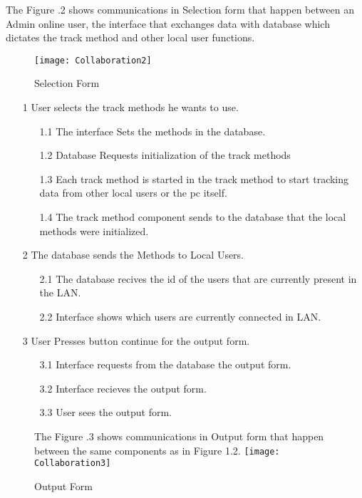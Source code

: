 The Figure \thesection.2 shows communications in Selection form that happen between an Admin online user, the interface that exchanges data with database which dictates the track method and other local user functions.
\begin{figure}[h!]
	\centering
\texttt{[image: Collaboration2]}
	\caption{Selection Form} 
\end{figure}
\begin{flushleft}
\begin{enumerate}
   \item[1] User selects the track methods he wants to use.
   \begin{itemize}
     \item[1.1] The interface Sets the methods in the database.
     \item[1.2] Database Requests initialization of the track methods
     \item[1.3] Each track method is started in the track method to start tracking data from other local users or the pc itself.
     \item[1.4] The track method component sends to the database that the local methods were initialized.
   \end{itemize}
   \item[2] The database sends the Methods to Local Users.
   \begin{itemize}
     \item[2.1] The database recives the id of the users that are currently present in the LAN. 
     \item[2.2] Interface shows which users are currently connected in LAN.
   \end{itemize}
   \item[3] User Presses button continue for the output form.
   \begin{itemize}
     \item[3.1] Interface requests from the database the output form.
     \item[3.2] Interface recieves the output form.
     \item[3.3]  User sees the output form.
   \end{itemize}
\end{enumerate}
\end{flushleft}
\begin{figure}[h!]
	\centering

The Figure \thesection.3 shows communications in Output form that happen between the same components as in Figure 1.2.	\texttt{[image: Collaboration3]}
	\caption{Output Form} 
\end{figure}
